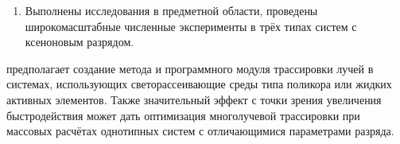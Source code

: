 \begin{enumerate}

	\item Выполнены исследования в предметной области, проведены широкомасштабные численные эксперименты в трёх типах систем с ксеноновым разрядом.
\end{enumerate}

 предполагает создание метода и программного модуля трассировки лучей в системах, использующих светорассеивающие среды типа поликора или жидких активных элементов.
Также значительный эффект с точки зрения увеличения быстродействия может дать оптимизация многолучевой трассировки при массовых расчётах однотипных систем с отличающимися параметрами разряда.
